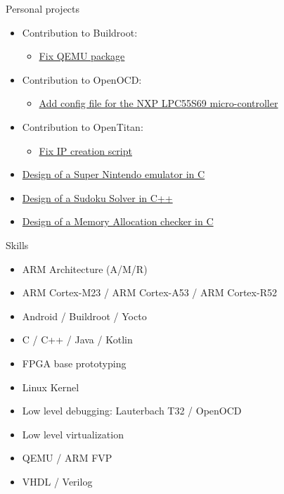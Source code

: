 \documentclass[a4paper, 10pt]{article}
\begin{document}
\begin{unbreakableSection} {Personal projects}
\begin{projects}
\begin{itemize}[parsep=0cm,itemsep=0cm,topsep=0cm]
\begin{itemize}[parsep=0cm,itemsep=0cm,topsep=0cm]
			\end{itemize}
		\item Contribution to Buildroot:
			\begin{itemize}[parsep=0cm,itemsep=0cm,topsep=0cm]
				\item \href{https://git.busybox.net/buildroot/commit/?id=c2cdde4887500ca809ab52ff75d22afdb3c1168d}{Fix QEMU package}
			\end{itemize}
		\item Contribution to OpenOCD:
			\begin{itemize}[parsep=0cm,itemsep=0cm,topsep=0cm]
				\item \href{https://review.openocd.org/c/openocd/+/6787}{Add config file for the NXP LPC55S69 micro-controller}
			\end{itemize}
		\item Contribution to OpenTitan:
			\begin{itemize}[parsep=0cm,itemsep=0cm,topsep=0cm]
				\item \href{https://github.com/lowRISC/opentitan/pull/9251}{Fix IP creation script}
			\end{itemize}
	    \item \href{https://github.com/grassead/snesemu}{Design of a Super Nintendo emulator in C}
	    \item \href{https://github.com/grassead/sudokusolver}{Design of a Sudoku Solver in C++}
	    \item \href{https://github.com/grassead/memorychecker}{Design of a Memory Allocation checker in C}
	\end{itemize}
    \end{projects}
\end{unbreakableSection}

\begin{section} {Skills}
    \begin{skills}
	\begin{itemize}[parsep=0cm,itemsep=0cm,topsep=0cm]
	    \item ARM Architecture (A/M/R)
	    \item ARM Cortex-M23 / ARM Cortex-A53 / ARM Cortex-R52
	    \item Android / Buildroot / Yocto
	    \item C / C++ / Java / Kotlin
            \item FPGA base prototyping
	    \item Linux Kernel
	    \item Low level debugging: Lauterbach T32 / OpenOCD
	    \item Low level virtualization
	    \item QEMU / ARM FVP
            \item VHDL / Verilog
	\end{itemize}
    \end{skills}
\end{section}
\end{document}
